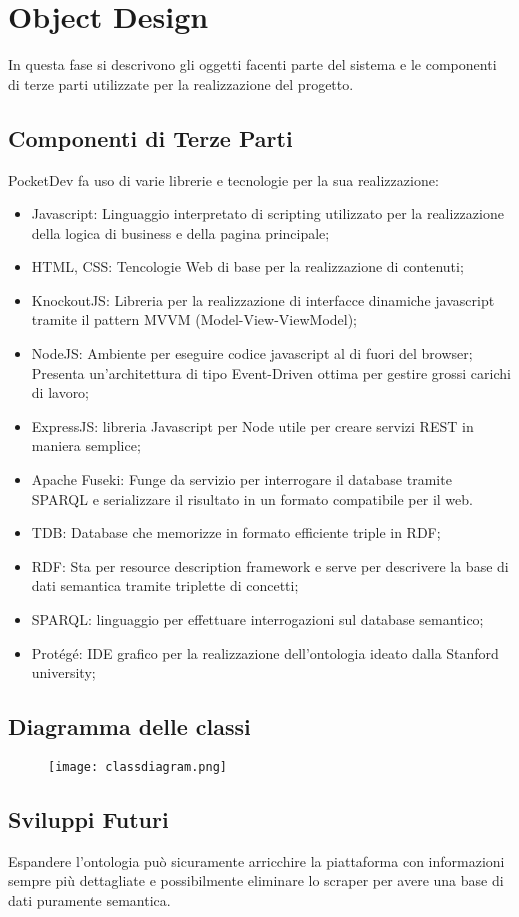 \section{Object Design}
In questa fase si descrivono gli oggetti facenti parte del sistema e le componenti di terze parti utilizzate per la realizzazione del progetto.
\subsection{Componenti di Terze Parti}
PocketDev fa uso di varie librerie e tecnologie per la sua realizzazione:
\begin{itemize}
 \item Javascript: Linguaggio interpretato di scripting utilizzato per la realizzazione della logica di business e della pagina principale;
 \item HTML, CSS: Tencologie Web di base per la realizzazione di contenuti;
 \item KnockoutJS: Libreria per la realizzazione di interfacce dinamiche javascript tramite il pattern MVVM (Model-View-ViewModel);
 \item NodeJS: Ambiente per eseguire codice javascript al di fuori del browser; Presenta un'architettura di tipo Event-Driven ottima per gestire grossi carichi di lavoro;
 \item ExpressJS: libreria Javascript per Node utile per creare servizi REST in maniera semplice;
 \item Apache Fuseki: Funge da servizio per interrogare il database tramite SPARQL e serializzare il risultato in un formato compatibile per il web.
 \item TDB: Database che memorizze in formato efficiente triple in RDF;
 \item RDF: Sta per resource description framework e serve per descrivere la base di dati semantica tramite triplette di concetti;
 \item SPARQL: linguaggio per effettuare interrogazioni sul database semantico;
 \item Protégé: IDE grafico per la realizzazione dell'ontologia ideato dalla Stanford university;
\end{itemize}
\subsection{Diagramma delle classi}
\begin{figure}[H]
 \texttt{[image: classdiagram.png]}
\end{figure}
\subsection{Sviluppi Futuri}
Espandere l'ontologia può sicuramente arricchire la piattaforma con informazioni sempre più dettagliate e possibilmente eliminare lo scraper per avere una base di dati puramente semantica. 
